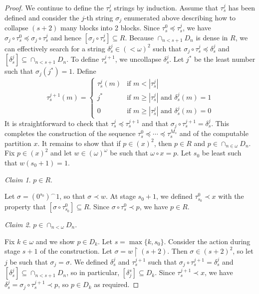 \documentclass{amsart}
\theoremstyle{definition}
\theoremstyle{remark}
\newtheorem*{claim}{Claim}
\newcommand{\restrict}{\upharpoonright}
\begin{document}
\begin{proof}
We continue to define the $\tau_s^j$ strings by induction. Assume that $\tau_s^j$ has been defined and consider the $j$-th string $\sigma_j$ 
enumerated above describing how to collapse $(s+2)$ many blocks into 2 blocks. Since $\tau_s^0 \preceq \tau_s^j$, we have 
$\sigma_j \circ \tau_s^0 \preceq \sigma_j \circ \tau_s^j$ and hence $[\sigma_j \circ \tau_s^j] \subseteq R$. Because $\cap_{n < s+1} D_n$ is dense in $R$, 
we can effectively search for a string $\delta_s^j \in (<\omega)^2$ such that $\sigma_j \circ \tau_s^j \preceq \delta_s^j$ and $[\delta_s^j] \subseteq 
\cap_{n < s+1} D_n$. To define $\tau_s^{j+1}$, we uncollapse $\delta_s^j$. Let $j^*$ be the least number such that $\sigma_j(j^*) = 1$. Define 
\[
\tau_s^{j+1}(m) = 
\left\{
\begin{array}{ll}
\tau_s^j(m) & \text{if } m < |\tau_s^j| \\
j^* & \text{if } m \geq |\tau_s^j| \text{ and } \delta_s^j(m) = 1 \\
0 & \text{if } m \geq |\tau_s^j| \text{ and } \delta_s^j(m) = 0
\end{array}
\right.
\]
It is straightforward to check that $\tau_s^j \preceq \tau_s^{j+1}$ and that $\sigma_j \circ \tau_s^{j+1} = \delta_s^j$. This completes the construction of 
the sequence $\tau_s^0 \preceq \cdots \preceq \tau_s^{M_s}$ and of the computable partition $x$. It remains to show that if $p \in (x)^2$, then $p \in R$ and 
$p \in \cap_{n \in \omega} D_n$. Fix $p \in (x)^2$ and let $w \in (\omega)^\omega$
be such that $\omega\circ x = p$.  Let $s_0$ be least such that $w(s_0+1)=1$.

\begin{claim}
$p \in R$.
\end{claim}

Let $\sigma = (0^{s_0})^\smallfrown 1$, so that $\sigma \prec w$.
At stage $s_0+1$, we defined $\tau_{s_0}^0 \prec x$ with the property that 
$[\sigma \circ \tau_{s_0}^0] \subseteq R$. Since $\sigma \circ \tau_s^0 \prec p$, we have $p \in R$. 

\begin{claim}
$p \in \cap_{n < \omega} D_n$.
\end{claim}

Fix $k \in \omega$ and we show $p \in D_k$. Let $s = \max \{ k,s_0 \}$. Consider the action during stage $s+1$ of the construction. Let $\sigma = w \restrict(s+2)$.
Then $\sigma\in(s+2)^2$, so let $j$ be such that $\sigma_j = \sigma$.
 We defined $\delta_s^j$ and $\tau_s^{j+1}$ such that 
$\sigma_j \circ \tau_s^{j+1} = \delta_s^j$ and $[\delta_s^j] \subseteq \cap_{n < s+1} D_n$, so in particular, $[\delta_j^s] \subseteq D_k$. Since $\tau_s^{j+1} \prec x$, we have $\delta_s^j = \sigma_j \circ \tau_s^{j+1} \prec p$, so $p \in D_k$ as required. 
\end{proof}
\end{document}

